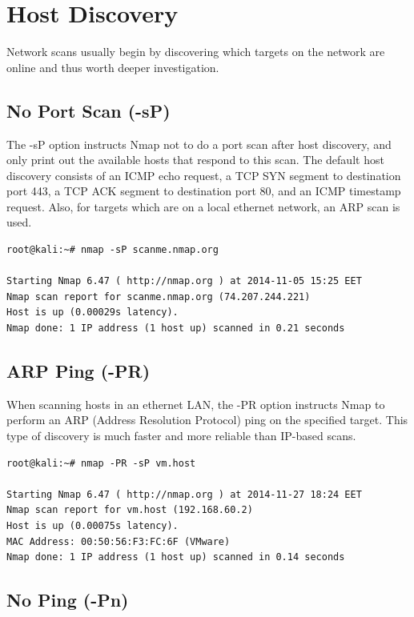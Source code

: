 \documentclass[a4paper,oneside,12pt]{book}
\begin{document}
\chapter{Host Discovery}

Network scans usually begin by discovering which targets on the network are online and thus worth deeper investigation.

\section{No Port Scan (-sP)}

The -sP option instructs Nmap not to do a port scan after host discovery, and only print out the available hosts that respond to this scan. The default host discovery consists of an ICMP echo request, a TCP SYN segment to destination port 443, a TCP ACK segment to destination port 80, and an ICMP timestamp request. Also, for targets which are on a local ethernet network, an ARP scan is used.

\begin{lstlisting}[title=A Nmap scan using the No Port Scan option]
root@kali:~# nmap -sP scanme.nmap.org

Starting Nmap 6.47 ( http://nmap.org ) at 2014-11-05 15:25 EET
Nmap scan report for scanme.nmap.org (74.207.244.221)
Host is up (0.00029s latency).
Nmap done: 1 IP address (1 host up) scanned in 0.21 seconds
\end{lstlisting}

\section{ARP Ping (-PR)}

When scanning hosts in an ethernet LAN, the -PR option instructs Nmap to perform an ARP (Address Resolution Protocol) ping on the specified target. This type of discovery is much faster and more reliable than IP-based scans.

\begin{lstlisting}[title=A Nmap scan using the ARP Ping option]
root@kali:~# nmap -PR -sP vm.host

Starting Nmap 6.47 ( http://nmap.org ) at 2014-11-27 18:24 EET
Nmap scan report for vm.host (192.168.60.2)
Host is up (0.00075s latency).
MAC Address: 00:50:56:F3:FC:6F (VMware)
Nmap done: 1 IP address (1 host up) scanned in 0.14 seconds
\end{lstlisting}

\section{No Ping (-Pn)}
\end{document}
